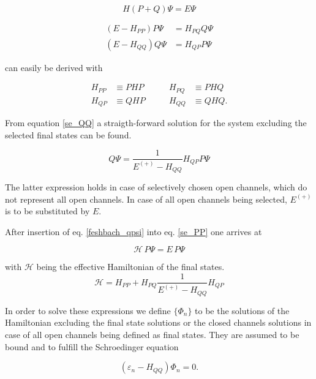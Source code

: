 \begin{equation}
  H (P+Q) \Psi = E \Psi
\end{equation}

\begin{align}
  (E - H_{PP}) P \Psi & = H_{PQ} Q \Psi \label{se_PP}\\
  (E - H_{QQ}) Q \Psi & = H_{QP} P \Psi \label{se_QQ}
\end{align}

can easily be derived with

\begin{align*}
  H_{PP} & \equiv PHP & \quad\quad H_{PQ} & \equiv PHQ\\
  H_{QP} & \equiv QHP & \quad\quad H_{QQ} & \equiv QHQ .
\end{align*}

From equation \ref{se_QQ} a straigth-forward solution for the system excluding
the selected final states can be found.

\begin{equation}
  Q \Psi = \frac{1}{E^{(+)}-H_{QQ}} H_{QP} P \Psi \label{feshbach_qpsi}
\end{equation}

The latter expression holds in case of selectively chosen open channels, which
do not represent all open channels. In case of all open channels being selected,
$E^{(+)}$ is to be substituted by $E$.

After insertion of eq. \ref{feshbach_qpsi} into eq. \ref{se_PP} one arrives at

\begin{equation}
  \mathscr{H} \,P \Psi = E \,P \Psi \label{se_ppsi}
\end{equation}

with $\mathscr{H}$ being the effective Hamiltonian of the final states.
\begin{equation}
  \mathscr{H} = H_{PP} + H_{PQ} \frac{1}{E^{(+)}-H_{QQ}} H_{QP}
\end{equation}

In order to solve these expressions we define $\{\Phi_n\}$ to be the solutions
of the Hamiltonian excluding the final state solutions or the closed channels
solutions in case of all open channels being defined as final states.
They are assumed to be bound and to fulfill the
Schroedinger equation

\begin{equation}
  (\varepsilon_n - H_{QQ}) \Phi_n = 0 .
\end{equation}

